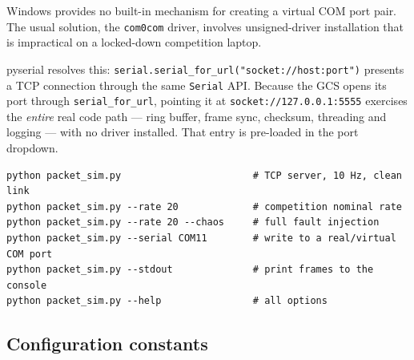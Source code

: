 \documentclass[11pt,a4paper]{article}
\newcommand{\code}[1]{\texttt{#1}}
\begin{document}
Windows provides no built-in mechanism for creating a virtual COM port pair.
The usual solution, the \code{com0com} driver, involves unsigned-driver
installation that is impractical on a locked-down competition laptop.

pyserial resolves this: \code{serial.serial\_for\_url("socket://host:port")}
presents a TCP connection through the same \code{Serial} API. Because the GCS
opens its port through \code{serial\_for\_url}, pointing it at
\code{socket://127.0.0.1:5555} exercises the \emph{entire} real code path ---
ring buffer, frame sync, checksum, threading and logging --- with no driver
installed. That entry is pre-loaded in the port dropdown.

\begin{lstlisting}[style=gcsshell,caption={Simulator invocations.}]
python packet_sim.py                       # TCP server, 10 Hz, clean link
python packet_sim.py --rate 20             # competition nominal rate
python packet_sim.py --rate 20 --chaos     # full fault injection
python packet_sim.py --serial COM11        # write to a real/virtual COM port
python packet_sim.py --stdout              # print frames to the console
python packet_sim.py --help                # all options
\end{lstlisting}

\subsection{Configuration constants}
\end{document}
